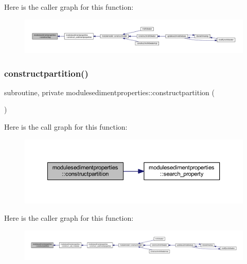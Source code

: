 Here is the caller graph for this function\+:\nopagebreak
\begin{figure}[H]
\begin{center}
\leavevmode
\includegraphics[width=350pt]{namespacemodulesedimentproperties_a8adc335e0f9814d9866b9c91620279fb_icgraph}
\end{center}
\end{figure}
\mbox{\label{namespacemodulesedimentproperties_a25b9b3491582d3d95d7501a1a79de02d}} 
\subsubsection{\texorpdfstring{constructpartition()}{constructpartition()}}
{\footnotesize\ttfamily subroutine, private modulesedimentproperties\+::constructpartition (\begin{DoxyParamCaption}{ }\end{DoxyParamCaption})\hspace{0.3cm}{\ttfamily [private]}}

Here is the call graph for this function\+:\nopagebreak
\begin{figure}[H]
\begin{center}
\leavevmode
\includegraphics[width=350pt]{namespacemodulesedimentproperties_a25b9b3491582d3d95d7501a1a79de02d_cgraph}
\end{center}
\end{figure}
Here is the caller graph for this function\+:\nopagebreak
\begin{figure}[H]
\begin{center}
\leavevmode
\includegraphics[width=350pt]{namespacemodulesedimentproperties_a25b9b3491582d3d95d7501a1a79de02d_icgraph}
\end{center}
\end{figure}
\mbox{\label{namespacemodulesedimentproperties_a8f2d8b343c149475187c15596c0bde5e}} 
